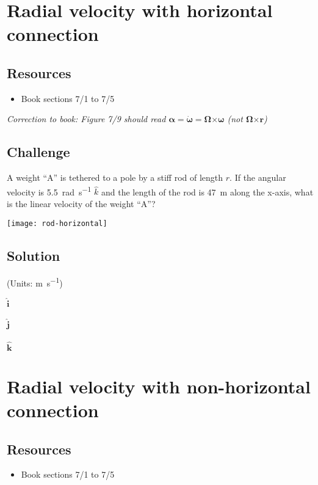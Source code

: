 \newpage
\section{Radial velocity with horizontal connection}

\subsection*{Resources}
\begin{itemize}
    \item Book sections 7/1 to 7/5
\end{itemize}

\emph{Correction to book: Figure 7/9 should read $\bm{\alpha} = \bm{\dot{\omega}} = \bm{\Omega} \bm{\times} \bm{\omega}$ (not $\bm{\Omega} \bm{\times} \bm{r}$)}

\subsection*{Challenge}
A weight ``A'' is tethered to a pole by a stiff rod of length $r$. If the angular velocity is \SI{5.5}{\radian\per\second} $\hat{k}$ and the length of the rod is \SI{47}{\meter} along the x-axis, what is the linear velocity of the weight ``A''?

\texttt{[image: rod-horizontal]}

\subsection*{Solution}
(Units: \si{\meter\per\second})

$\bm{\hat{i}}$\\
\\

$\bm{\hat{j}}$\\
\\

$\bm{\hat{k}}$\\




\newpage
\section{Radial velocity with non-horizontal connection}

\subsection*{Resources}
\begin{itemize}
    \item Book sections 7/1 to 7/5
\end{itemize}

